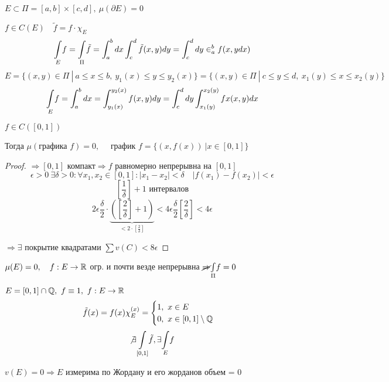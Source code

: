     \begin{illustration}
        $E \subset \Pi = [a, b] \times [c, d], \ \mu (\partial E) = 0$
        \par $f \in C(E) \quad \tilde{f} = f \cdot \chi_E$
        \[
            \underset{E}{\int} f = \underset{\Pi}{\int} \tilde{f} = \int_a^b dx \int_c^d \tilde{f}(x, y)dy = \int_c^d dy \in_a^b f(x, ydx)    
        \]
        \[
            E = \{(x, y) \in \Pi \ | \ a \le x \le b, \ y_1(x) \le y \le y_2(x)\} = \{(x, y) \in \Pi \ | \ c \le y \le d , \ x_1(y) \le x \le x_2(y)\}   
        \]
        \[
            \underset{E}{\int} f = \int_a^b dx = \int_{y_1(x)}^{y_2(x)} f(x, y) dy = \int_c^d dy \int_{x_1(y)}^{x_2(y)} fx(x, y)dx    
        \]
    \end{illustration}

    \begin{remark}
        $f \in C([0, 1])$
        \par Тогда $\mu(\text{графика } f) = 0, \quad$ график $f = \{(x, f(x)) \ | x \in [0, 1]\}$
    \end{remark}
    \begin{proof}
        $\Rightarrow [0, 1] \text{ компакт} \Rightarrow f $ равномерно непрерывна на $[0, 1]$
        \[
            \epsilon > 0 \ \exists \delta > 0 : \forall x_1, x_2 \in [0, 1] : |x_1 - x_2| < \delta \quad |f(x_1) - f(x_2)| < \epsilon
        \]
        \[
            \left[\frac 1 \delta\right] + 1 \text{ интервалов}    
        \]
        \[
            2\epsilon \frac \delta 2 \cdot \underbrace{\left(\left[\frac 2 \delta\right] + 1\right)}_{< 2 \cdot \left[\frac 2 \delta\right]} < 4 \epsilon \frac \delta 2 \left[\frac 2 \delta\right] < 4 \epsilon
        \] %
        \par {}
        \par {} %
        \par $\Rightarrow \exists$ покрытие квадратами $\sum v(C) < 8 \epsilon$
    \end{proof}

    $\mu(E) = 0, \quad f : E \rightarrow \mathbb{R}$ огр. и почти везде непрерывна $\cancel \Rightarrow \underset{\Pi}{\int} f = 0$
    \par $E = [0,1] \cap \mathbb{Q}, \ f \equiv 1, \ f : E \rightarrow \mathbb{R}$
    \[
        \tilde f(x) = f(x)\chi_E^{(x)} = \begin{cases}
            1, \ x\in E \\
            0, \ x \in [0,1] \setminus \mathbb{Q}
        \end{cases}    
    \]
    \[
        \not\exists \underset{[0, 1]}{\int} \tilde f, \exists \underset{E}{\int}f    
    \]
    \par $v(E) = 0 \Rightarrow E$ измерима по Жордану и его жорданов объем = 0
    
